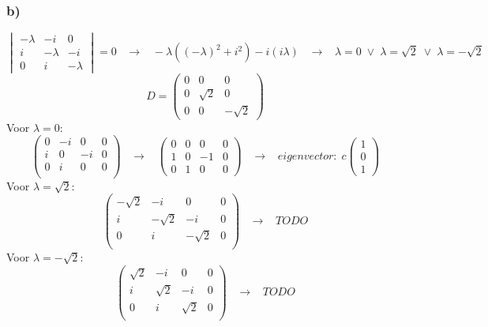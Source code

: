 \documentclass[11pt]{article}
\begin{document}
\subsubsection*{b)}
\[
\begin{vmatrix}
-\lambda & -i & 0\\
i & - \lambda & -i \\
0 & i & -\lambda
\end{vmatrix}
=0
\;\;\;\longrightarrow\;\;\;
-\lambda((-\lambda)^2 + i^2)-i(i\lambda)
\;\;\;\longrightarrow\;\;\;
\lambda = 0 \;\vee\; \lambda = \sqrt{2} \;\vee\; \lambda = -\sqrt{2}
\]
\[
D = 
\begin{pmatrix}
0 & 0 & 0\\
0 & \sqrt{2} & 0\\
0 & 0 & -\sqrt{2}
\end{pmatrix}
\]
Voor $\lambda = 0$: 
\[
\left(
\begin{array}{ccc|c}
0 & -i & 0 & 0\\
i & 0 & -i & 0\\
0 & i & 0 & 0\\
\end{array}
\right)
\;\;\;\longrightarrow\;\;\;
\left(
\begin{array}{ccc|c}
0 & 0 & 0 & 0\\
1 & 0 & -1 & 0\\
0 & 1 & 0 & 0
\end{array}
\right)
\;\;\;\longrightarrow\;\;\;
eigenvector:\;
c
\begin{pmatrix}
1\\0\\1
\end{pmatrix}
\]
Voor $\lambda = \sqrt{2}$: 
\[
\left(
\begin{array}{ccc|c}
-\sqrt{2} & -i & 0 & 0\\
i & -\sqrt{2} & -i & 0\\
0 & i & -\sqrt{2} & 0\\
\end{array}
\right)
\;\;\;\longrightarrow\;\;\;
TODO
\]
Voor $\lambda = -\sqrt{2}$: 
\[
\left(
\begin{array}{ccc|c}
\sqrt{2} & -i & 0 & 0\\
i & \sqrt{2} & -i & 0\\
0 & i & \sqrt{2} & 0\\
\end{array}
\right)
\;\;\;\longrightarrow\;\;\;
TODO
\]
\end{document}
